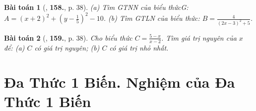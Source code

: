 \documentclass{article}
\numberwithin{equation}{section}
\newtheorem{baitoan}{Bài toán}
\begin{document}
\begin{baitoan}[\cite{Tuyen_Toan_7}, \textbf{158.}, p. 38]
	(a) Tìm GTNN của biểu thứcG: $A = (x + 2)^2 + \left(y - \frac{1}{5}\right)^2 - 10$. (b) Tìm GTLN của biểu thức: $B = \frac{4}{(2x - 3)^2 + 5}$.
\end{baitoan}

\begin{baitoan}[\cite{Tuyen_Toan_7}, \textbf{159.}, p. 38]
	Cho biểu thức $C = \frac{5 - x}{x - 2}$. Tìm giá trị nguyên của $x$ để: (a) $C$ có giá trị nguyên; (b) $C$ có giá trị nhỏ nhất.
\end{baitoan}


\section{Đa Thức 1 Biến. Nghiệm của Đa Thức 1 Biến}
\end{document}
